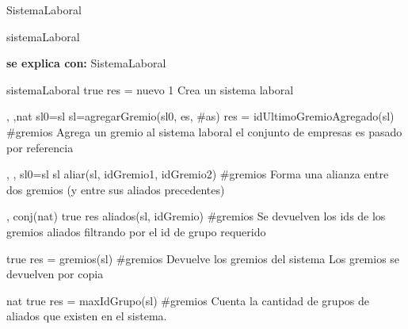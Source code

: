 \begin{interfaz}{SistemaLaboral}
\begin{iparamformales}{sistemaLaboral}

\textbf{\large se explica con:} SistemaLaboral

\end{iparamformales}

{}{sistemaLaboral}
{true}
{res = nuevo}
{1}
{Crea un sistema laboral}
{}

{, ,}{nat}
{sl0=sl}
{sl=agregarGremio(sl0, es, \#as) \land res = idUltimoGremioAgregado(sl)}
{\#gremios}
{Agrega un gremio al sistema laboral}
{el conjunto de empresas es pasado por referencia}

{, , }{}
{sl0=sl}
{sl \igobs aliar(sl, idGremio1, idGremio2)}
{\#gremios}
{Forma una alianza entre dos gremios (y entre sus aliados precedentes)}
{}

{, }{conj(nat)}
{true}
{res \igobs aliados(sl, idGremio)}
{\#gremios}
{Se devuelven los ids de los gremios aliados filtrando por el id de grupo requerido}
{}

{true}
{res = gremios(sl)}
{\#gremios}
{Devuelve los gremios del sistema}
{Los gremios se devuelven por copia}

{}{nat}
{true}
{res = maxIdGrupo(sl)}
{\#gremios}
{Cuenta la cantidad de grupos de aliados que existen en el sistema. }
{}

\end{interfaz}
